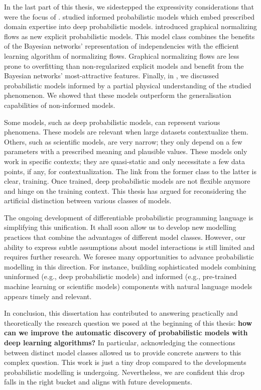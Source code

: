 In the last part of this thesis, we sidestepped the expressivity considerations that were the focus of .   studied informed probabilistic models which embed prescribed domain expertise into deep probabilistic models.  introduced graphical normalizing flows as new explicit probabilistic models. This model class combines the benefits of the Bayesian networks' representation of independencies with the efficient learning algorithm of normalizing flows. Graphical normalizing flows are less prone to overfitting than non-regularized explicit models and benefit from the Bayesian networks' most-attractive features. Finally, in , we discussed probabilistic models informed by a partial physical understanding of the studied phenomenon. We showed that these models outperform the generalisation capabilities of non-informed models. %

Some models, such as deep probabilistic models, can represent various phenomena. These models are relevant when large datasets contextualize them. Others, such as scientific models, are very narrow; they only depend on a few parameters with a prescribed meaning and plausible values. These models only work in specific contexts; they are quasi-static and only necessitate a few data points, if any, for contextualization. The link from the former class to the latter is clear, training. Once trained, deep probabilistic models are not flexible anymore and hinge on the training context. This thesis has argued for reconsidering the artificial distinction between various classes of models.

The ongoing development of differentiable probabilistic programming language is simplifying this unification. It shall soon allow us to develop new modelling practices that combine the advantages of different model classes. However, our ability to express subtle assumptions about model interactions is still limited and requires further research. We foresee many opportunities to advance probabilistic modelling in this direction. For instance, building sophisticated models combining uninformed (e.g., deep probabilistic models) and informed (e.g., pre-trained machine learning or scientific models) components with natural language models appears timely and relevant.

In conclusion, this dissertation has contributed to answering practically and theoretically the research question we posed at the beginning of this thesis: \textbf{how can we improve the automatic discovery of probabilistic models with deep learning algorithms?} In particular, acknowledging the connections between distinct model classes allowed us to provide concrete answers to this complex question. This work is just a tiny drop compared to the developments probabilistic modelling is undergoing. Nevertheless, we are confident this drop falls in the right bucket and aligns with future developments.

